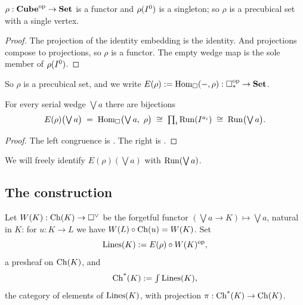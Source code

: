 \documentclass[11pt]{article}
\begin{document}
\begin{lemma}\label{lem:rho-functor}
  $\rho : \mathbf{Cube}^{\mathrm{op}} \to \mathbf{Set}$ is a functor and $\rho(I^{0})$ is a singleton; so $\rho$ is a
  precubical set with a single vertex.
\end{lemma}
\begin{proof}
  The projection of the identity embedding is the identity.
  And projections compose to projections, so $\rho$ is a functor.
  The empty wedge map is the sole member of $\rho(I^{0})$.
\end{proof}

So $\rho$ is a precubical set, and we write $E(\rho) := \operatorname{Hom}_{\square}(-, \rho) : \square_{*}^{\mathrm{op}} \to \mathbf{Set}$.

\begin{lemma}\label{lem:rho-classifies}
  For every serial wedge $\bigvee a$ there are bijections
  \[
    E(\rho)\bigl(\textstyle\bigvee a\bigr) \;=\; \operatorname{Hom}_{\square}\bigl(\textstyle\bigvee a,\ \rho\bigr)
      \;\cong\; \prod_i \operatorname{Run}(I^{a_i}) \;\cong\; \operatorname{Run}\bigl(\textstyle\bigvee a\bigr).
  \]
\end{lemma}
\begin{proof}
  The left congruence is . The right is . 
\end{proof}

We will freely identify $E(\rho)(\bigvee a)$ with $\operatorname{Run}(\bigvee a)$.

\subsection{The construction}

\begin{definition}\label{def:chstar}
Let $W(K) : \operatorname{Ch}(K) \to \square^{\vee}$ be the forgetful functor $(\bigvee a \to K) \mapsto \bigvee a$, natural
in $K$: for $u : K \to L$ we have $W(L) \circ \operatorname{Ch}(u) = W(K)$. Set
\[
  \operatorname{Lines}(K) := E(\rho) \circ W(K)^{\mathrm{op}},
\]
a presheaf on $\operatorname{Ch}(K)$, and
\[
  \operatorname{Ch^*}(K) := \textstyle\int \operatorname{Lines}(K),
\]
the category of elements of $\operatorname{Lines}(K)$, with projection $\pi : \operatorname{Ch^*}(K) \to \operatorname{Ch}(K)$.
\end{definition}
\end{document}
